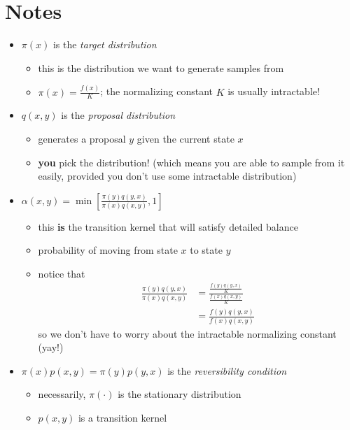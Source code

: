 \documentclass[10pt,a4paper]{article}
\begin{document}
\section{Notes}
\begin{itemize}
	\item $\pi(x)$ is the \textit{target distribution}
	\begin{itemize}
		\item this is the distribution we want to generate samples from
		\item $\pi(x) = \frac{f(x)}{K}$; the normalizing constant $K$ is usually intractable!
	\end{itemize}
	\item $q(x,y)$ is the \textit{proposal distribution} 
	\begin{itemize}
		\item generates a proposal $y$ given the current state $x$
		\item \textbf{you} pick the distribution! (which means you are able to sample from it easily, provided you don't use some intractable distribution)
	\end{itemize}
	\item $\alpha(x,y) = \min [\frac{\pi(y)q(y,x)}{\pi(x)q(x,y)}, 1 ]$ 
	\begin{itemize}
		\item this \textbf{is} the transition kernel that will satisfy detailed balance
		\item probability of moving from state $x$ to state $y$
		\item notice that
		\begin{align*}
		\frac{\pi(y)q(y,x)}{\pi(x)q(x,y)} &= \frac{\frac{f(y)q(y,x)}{K}}{\frac{f(x)q(x,y)}{K}}\\
		&= \frac{f(y)q(y,x)}{f(x)q(x,y)}
		\end{align*}
		so we don't have to worry about the intractable normalizing constant (yay!)		 
	\end{itemize}
	\item $\pi(x)p(x,y) = \pi(y)p(y,x)$ is the \textit{reversibility condition}
	\begin{itemize}
		\item necessarily, $\pi(\cdot)$ is the stationary distribution
		\item $p(x,y)$ is a transition kernel 
	\end{itemize}
\end{itemize}
\end{document}
